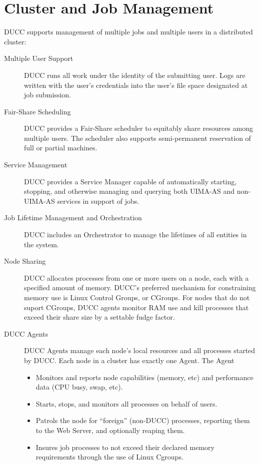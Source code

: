     \section{Cluster and Job Management}
    DUCC supports  management of multiple jobs and multiple users in a distributed cluster:

    \begin{description}
        \item[Multiple User Support] DUCC runs all work under the identity of the submitting user. Logs
          are written with the user's credentials into the user's file space designated at job
          submission.

        \item[Fair-Share Scheduling] DUCC provides a Fair-Share scheduler to equitably share
          resources among multiple users.  The scheduler also supports semi-permanent reservation of
          full or partial machines.

        \item[Service Management] DUCC provides a Service Manager capable of automatically starting, stopping, and
          otherwise managing and querying both UIMA-AS and non-UIMA-AS services in support of jobs.

        \item[Job Lifetime Management and Orchestration] DUCC includes an Orchestrator to manage the
          lifetimes of all entities in the system.

        \item[Node Sharing] DUCC allocates processes from one or more users on a node, each with a specified
          amount of memory.  DUCC's preferred mechanism for constraining memory use is Linux
          Control Groups, or CGroups.  For nodes that do not suport CGroups, DUCC agents monitor
          RAM use and kill processes that exceed their share size by a settable fudge factor.

        \item[DUCC Agents] DUCC Agents manage each node's local resources and all
          processes started by DUCC. Each node in a cluster has exactly one Agent. The Agent
          \begin{itemize}
            \item Monitors and reports node capabilities (memory, etc) and performance data (CPU busy,
              swap, etc).
            \item Starts, stops, and monitors all processes on behalf of users.
            \item Patrols the node for ``foreign'' (non-DUCC) processes, reporting them to the
              Web Server, and optionally reaping them.
            \item Insures job processes to not exceed their declared memory requirements
              through the use of Linux Cgroups.
          \end{itemize}


\end{description}
